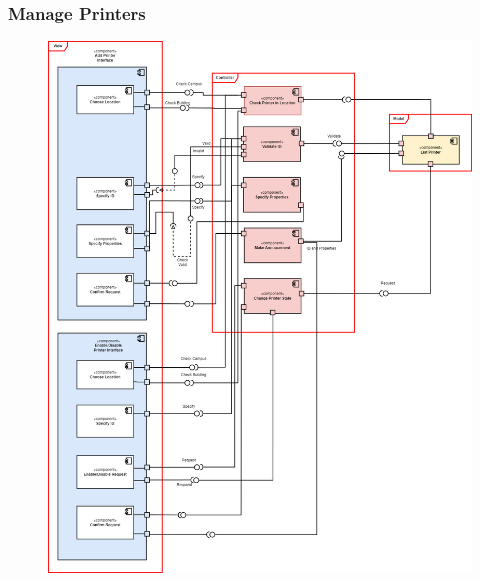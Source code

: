         \subsubsection{Manage Printers}
        \begin{center}
        \begin{figure}[!htp]
        \begin{center}
         \includegraphics[scale=0.31]{images/Task3/Component Diagrams/ManagePrinterComponentDiagram.png}
        \end{center}
        \end{figure}
        \end{center}

